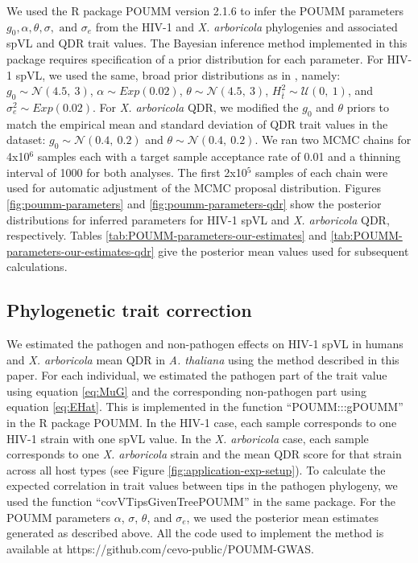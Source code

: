 \documentclass[11pt]{article}
\begin{document}
\begin{linenumbers}
We used the R package POUMM version 2.1.6 \citep{Mitov2017a-POUMM} to infer the POUMM parameters $g_0, \alpha, \theta, \sigma, \text{ and }\sigma_e$ from the HIV-1 and \emph{X. arboricola} phylogenies and associated spVL and QDR trait values. The Bayesian inference method implemented in this package requires specification of a prior distribution for each parameter. For HIV-1 spVL, we used the same, broad prior distributions as in \citet{Mitov2018}, namely: $g_{0} \sim \mathcal{N}(4.5,\ 3)$, $\alpha \sim Exp(0.02)$, $\theta \sim \mathcal{N}(4.5,\ 3)$, $H^2_{\bar{t}} \sim \mathcal{U}(0,\ 1)$, and $\sigma^2_e \sim Exp(0.02)$. For \emph{X. arboricola} QDR, we modified the $g_0$ and $\theta$ priors to match the empirical mean and standard deviation of QDR trait values in the dataset: $g_{0} \sim \mathcal{N}(0.4,\ 0.2)$ and $\theta \sim \mathcal{N}(0.4,\ 0.2)$. We ran two MCMC chains for 4x10$^6$ samples each with a target sample acceptance rate of 0.01 and a thinning interval of 1000 for both analyses. The first 2x10$^5$ samples of each chain were used for automatic adjustment of the MCMC proposal distribution. Figures \ref{fig:poumm-parameters} and \ref{fig:poumm-parameters-qdr} show the posterior distributions for inferred parameters for HIV-1 spVL and \emph{X. arboricola} QDR, respectively. Tables \ref{tab:POUMM-parameters-our-estimates} and \ref{tab:POUMM-parameters-our-estimates-qdr} give the posterior mean values used for subsequent calculations.

\subsection*{Phylogenetic trait correction}
We estimated the pathogen and non-pathogen effects on HIV-1 spVL in humans and \emph{X. arboricola} mean QDR in \emph{A. thaliana} using the method described in this paper. For each  individual, we estimated the pathogen part of the trait value using equation \ref{eq:MuG} and the corresponding non-pathogen part using equation \ref{eq:EHat}. This is implemented in the function ``POUMM:::gPOUMM'' in the R package POUMM. In the HIV-1 case, each sample corresponds to one HIV-1 strain with one spVL value. In the \emph{X. arboricola} case, each sample corresponds to one \emph{X. arboricola} strain and the mean QDR score for that strain across all host types (see Figure \ref{fig:application-exp-setup}). To calculate the expected correlation in trait values between tips in the pathogen phylogeny, we used the function ``covVTipsGivenTreePOUMM'' in the same package. For the POUMM parameters $\alpha$, $\sigma$, $\theta$, and $\sigma_e$, we used the posterior mean estimates generated as described above. All the code used to implement the method is available at https://github.com/cevo-public/POUMM-GWAS.


\end{linenumbers}
\end{document}
